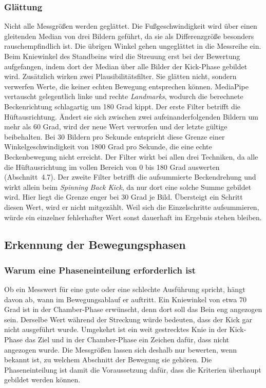 \documentclass[intern]{cgMA}
\begin{document}
\subsubsection{Glättung}
Nicht alle Messgrößen werden geglättet. Die Fußgeschwindigkeit wird über einen gleitenden Median von drei Bildern geführt, da sie als Differenzgröße besonders rauschempfindlich ist. Die übrigen Winkel gehen ungeglättet in die Messreihe ein. Beim Kniewinkel des Standbeins wird die Streuung erst bei der Bewertung aufgefangen, indem dort der Median über alle Bilder der Kick-Phase gebildet wird.
Zusätzlich wirken zwei Plausibilitätsfilter. Sie glätten nicht, sondern verwerfen Werte, die keiner echten Bewegung entsprechen können. MediaPipe vertauscht gelegentlich linke und rechte \textit{Landmarks}, wodurch die berechnete Beckenrichtung schlagartig um 180 Grad kippt. 
Der erste Filter betrifft die Hüftausrichtung. Ändert sie sich zwischen zwei aufeinanderfolgenden Bildern um mehr als 60 Grad, wird der neue Wert verworfen und der letzte gültige beibehalten. Bei 30 Bildern pro Sekunde entspricht diese Grenze einer Winkelgeschwindigkeit von 1800 Grad pro Sekunde, die eine echte Beckenbewegung nicht erreicht. Der Filter wirkt bei allen drei Techniken, da alle die Hüftausrichtung im vollen Bereich von 0 bis 180 Grad auswerten (Abschnitt~4.7).
Der zweite Filter betrifft die aufsummierte Beckendrehung und wirkt allein beim \textit{Spinning Back Kick}, da nur dort eine solche Summe gebildet wird. Hier liegt die Grenze enger bei 30 Grad je Bild. Übersteigt ein Schritt diesen Wert, wird er nicht mitgezählt. Weil sich die Einzelschritte aufsummieren, würde ein einzelner fehlerhafter Wert sonst dauerhaft im Ergebnis stehen bleiben.
\subsection{Erkennung der Bewegungsphasen}
\subsubsection{Warum eine Phaseneinteilung erforderlich ist}
Ob ein Messwert für eine gute oder eine schlechte Ausführung spricht, hängt davon ab, wann im Bewegungsablauf er auftritt. Ein Kniewinkel von etwa 70 Grad ist in der Chamber-Phase erwünscht, denn dort soll das Bein eng angezogen sein. Derselbe Wert während der Streckung würde bedeuten, dass der Kick gar nicht ausgeführt wurde. Umgekehrt ist ein weit gestrecktes Knie in der Kick-Phase das Ziel und in der Chamber-Phase ein Zeichen dafür, dass nicht angezogen wurde.
Die Messgrößen lassen sich deshalb nur bewerten, wenn bekannt ist, zu welchem Abschnitt der Bewegung sie gehören. Die Phaseneinteilung ist damit die Voraussetzung dafür, dass die Kriterien überhaupt gebildet werden können.
\end{document}
